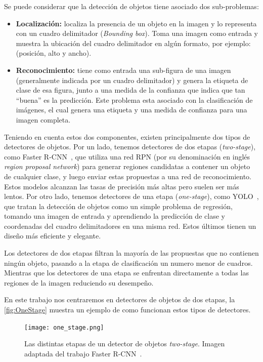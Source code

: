 Se puede considerar que la detección de objetos tiene asociado dos sub-problemas:

\begin{itemize}
	\item \textbf{Localización:} localiza la presencia de un objeto en la imagen y lo representa con un cuadro delimitador (\textit{Bounding box}). Toma una imagen como entrada y muestra la ubicación del cuadro delimitador en algún formato, por ejemplo: (posición, alto y ancho).
	\item \textbf{Reconocimiento:} tiene como entrada una sub-figura de una imagen (generalmente indicada por un cuadro delimitador) y genera la etiqueta de clase de esa figura, junto a una medida de la confianza que indica que tan ``buena'' es la predicción. Este problema esta asociado con la clasificación de imágenes, el cual genera una etiqueta y una medida de confianza para una imagen completa.
\end{itemize}


Teniendo en cuenta estos dos componentes, existen principalmente dos tipos de detectores de objetos. Por un lado, tenemos detectores de dos etapas (\textit{two-stage}), como Faster R-CNN~\cite{ren2015faster}, que utiliza una red  RPN (por su denominación en inglés \textit{region proposal network}) para generar regiones candidatas a contener un objeto de cualquier clase, y luego enviar estas propuestas a una red de reconocimiento. Estos modelos alcanzan las tasas de precisión más altas pero suelen ser más lentos. Por otro lado, tenemos detectores de una etapa (\textit{one-stage}), como YOLO~\cite{redmon2016you}, que tratan la detección de objetos como un simple problema de regresión, tomando una imagen de entrada y aprendiendo la predicción de clase y coordenadas del cuadro delimitadores en una misma red. Estos últimos tienen un diseño más eficiente y elegante. 

Los detectores de dos etapas filtran la mayoría de las propuestas que no contienen ningún objeto, pasando a la etapa de clasificación un numero menor de cuadros. Mientras que los detectores de una etapa se enfrentan directamente a todas las regiones de la imagen reduciendo su desempeño.

En este trabajo nos centraremos en detectores de objetos de dos etapas, la \autoref{fig:OneStage} muestra un ejemplo de como funcionan estos tipos de detectores.\\

\begin{figure}
	\centering
	\texttt{[image: one\_stage.png]}
	\caption{Las distintas etapas de un detector de objetos \textit{two-stage}. Imagen adaptada del trabajo Faster R-CNN~\cite{ren2015faster}.}
	\label{fig:OneStage}
\end{figure}

